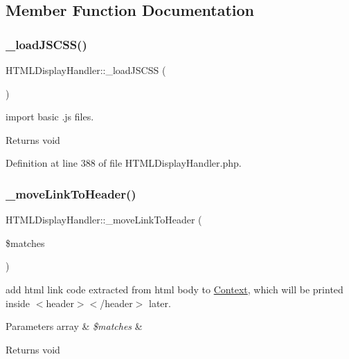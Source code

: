 \subsection{Member Function Documentation}
\mbox{\label{classHTMLDisplayHandler_a061f7f11230af884eb1784a2d495fbfd}} 
\subsubsection{\texorpdfstring{\+\_\+load\+J\+S\+C\+S\+S()}{\_loadJSCSS()}}
{\footnotesize\ttfamily H\+T\+M\+L\+Display\+Handler\+::\+\_\+load\+J\+S\+C\+SS (\begin{DoxyParamCaption}{ }\end{DoxyParamCaption})}

import basic .js files. \begin{DoxyReturn}{Returns}
void 
\end{DoxyReturn}


Definition at line 388 of file H\+T\+M\+L\+Display\+Handler.\+php.

\mbox{\label{classHTMLDisplayHandler_a6ea4cd64e8099e5ded248ec376772913}} 
\subsubsection{\texorpdfstring{\+\_\+move\+Link\+To\+Header()}{\_moveLinkToHeader()}}
{\footnotesize\ttfamily H\+T\+M\+L\+Display\+Handler\+::\+\_\+move\+Link\+To\+Header (\begin{DoxyParamCaption}\item[{}]{\$matches }\end{DoxyParamCaption})}

add html link code extracted from html body to \hyperlink{classContext}{Context}, which will be printed inside $<$header$>$$<$/header$>$ later. 
\begin{DoxyParams}[1]{Parameters}
array & {\em \$matches} & \\
\hline
\end{DoxyParams}
\begin{DoxyReturn}{Returns}
void 
\end{DoxyReturn}


